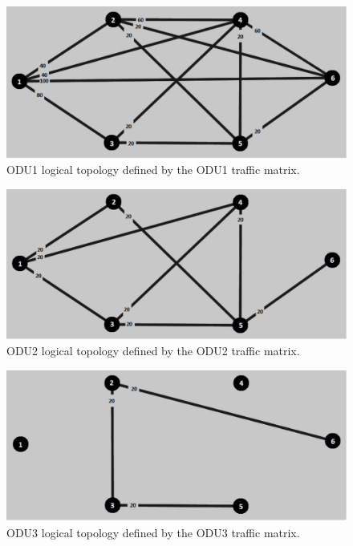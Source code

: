 \begin{figure}[H]
\centering
\includegraphics[width=13cm]{sdf/heuristic/transparent_protection/figures/logical_topology_odu1_high}
\caption{ODU1 logical topology defined by the ODU1 traffic matrix.}
\label{logical_ODU1_protection_ref_high_heuristic_transparent}
\end{figure}

\begin{figure}[H]
\centering
\includegraphics[width=13cm]{sdf/heuristic/transparent_protection/figures/logical_topology_odu2_high}
\caption{ODU2 logical topology defined by the ODU2 traffic matrix.}
\label{logical_ODU2_protection_ref_high_heuristic_transparent}
\end{figure}

\begin{figure}[H]
\centering
\includegraphics[width=13cm]{sdf/heuristic/transparent_protection/figures/logical_topology_odu3_high}
\caption{ODU3 logical topology defined by the ODU3 traffic matrix.}
\label{logical_ODU3_protection_ref_high_heuristic_transparent}
\end{figure}

